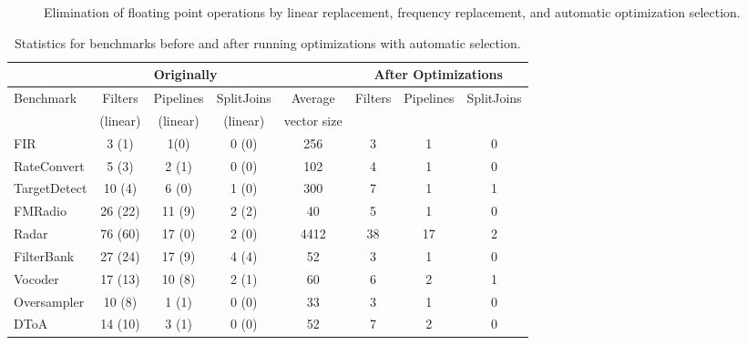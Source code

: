 \begin{figure}[t]
\vspace{-16pt}
\vspace{-16pt}
\caption{Elimination of floating point operations by linear replacement, frequency replacement, and automatic optimization selection.}
\label{fig:flops}
\vspace{-12pt}
\makeline
\vspace{-12pt}
\end{figure}

\begin{table*}[t]
\vspace{-16pt}
\centering
\small
\begin{tabular}{|l|c|c|c||c||c|c|c|} 
\hline
& \multicolumn{3}{|c||}{Originally}  &             & \multicolumn{3}{|c|}{After Optimizations} \\
\hline
Benchmark  & Filters & Pipelines& SplitJoins & Average     & Filters      & Pipelines         & SplitJoins \\
           & (linear)& (linear) & (linear)   & vector size &              &                   &            \\
\hline
FIR        & 3 (1)   & 1(0)     & 0 (0)      & 256         & 3            & 1                 & 0 \\
\hline
RateConvert& 5 (3)   & 2 (1)    & 0 (0)      & 102         & 4            & 1                 & 0 \\
\hline
TargetDetect& 10 (4) & 6 (0)    & 1 (0)      & 300         & 7            & 1                 & 1 \\
\hline
FMRadio    & 26 (22) & 11 (9)   & 2 (2)      & 40          & 5            & 1                 & 0 \\
\hline
Radar      & 76 (60) & 17 (0)   & 2 (0)      & 4412        & 38           & 17                & 2 \\
\hline
FilterBank & 27 (24) & 17 (9)   & 4 (4)      & 52          & 3            & 1                 & 0 \\
\hline
Vocoder    & 17 (13) & 10 (8)   & 2 (1)      & 60          & 6            & 2                 & 1 \\
\hline
Oversampler& 10 (8) & 1 (1)     & 0 (0)      & 33          & 3            & 1                 & 0 \\
\hline
DToA       & 14 (10) & 3 (1)    & 0 (0)      & 52          & 7            & 2                 & 0 \\
\hline
\end{tabular}
\vspace{-3pt}
\caption{Statistics for benchmarks before and after running optimizations with automatic selection.
\protect\label{fig:benchmark-statistics}}
\makeline
\vspace{-8pt}
\end{table*}

